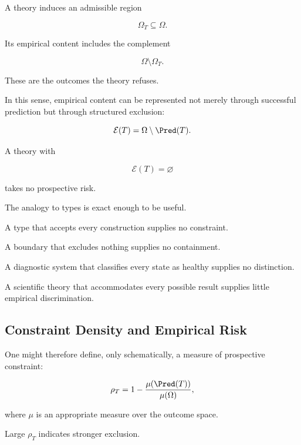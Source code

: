 \documentclass[11pt]{article}
\theoremstyle{remark}
\begin{document}
A theory induces an admissible region

\begin{equation}
\Omega_T\subseteq\Omega.
\end{equation}

Its empirical content includes the complement

\begin{equation}
\Omega\setminus\Omega_T.
\end{equation}

These are the outcomes the theory refuses.

In this sense, empirical content can be represented not merely through successful prediction but through structured exclusion:

\begin{equation}
\mathcal{E}(T)
=
\Omega\setminus\Pred(T).
\end{equation}

A theory with

\begin{equation}
\mathcal{E}(T)=\varnothing
\end{equation}

takes no prospective risk.

The analogy to types is exact enough to be useful.

A type that accepts every construction supplies no constraint.

A boundary that excludes nothing supplies no containment.

A diagnostic system that classifies every state as healthy supplies no distinction.

A scientific theory that accommodates every possible result supplies little empirical discrimination.

\subsection{Constraint Density and Empirical Risk}

One might therefore define, only schematically, a measure of prospective constraint:

\begin{equation}
\rho_T
=
1-
\frac{
\mu(\Pred(T))
}{
\mu(\Omega)
},
\end{equation}

where $\mu$ is an appropriate measure over the outcome space.

Large $\rho_T$ indicates stronger exclusion.
\end{document}
